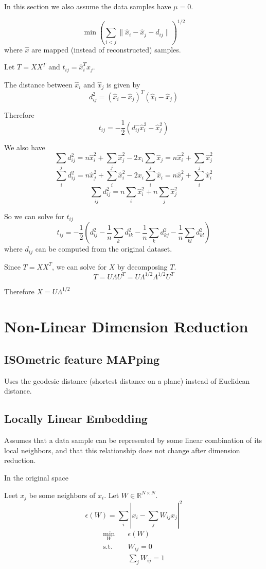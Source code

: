     In this section we also assume the data samples have $\mu=0$.

    \[ \min \left(\sum_{i<j}\|\hat{x}_i-\hat{x}_j-d_{ij}\|\right)^{1/2} \]
    where $\hat{x}$ are mapped (instead of reconstructed) samples.

    Let $T=XX^T$ and $t_{ij}=\hat{x}_i^T\hat{x}_j$.

    The distance between $\hat{x}_i$ and $\hat{x}_j$ is given by
    \[d_{ij}^2 = (\hat{x}_i-\hat{x}_j)^T(\hat{x}_i-\hat{x}_j)\]

    Therefore
    \[ t_{ij} = -\frac{1}{2}(d_{ij}^-\hat{x}_i^2-\hat{x}_j^2) \]

    We also have
    \[\sum_j d_{ij}^2 = n\hat{x}_i^2 + \sum_j\hat{x}_j^2 - 2x_i\sum_j\hat{x}_j = n\hat{x}_i^2 + \sum_j\hat{x}_j^2\]
    \[\sum_i d_{ij}^2 = n\hat{x}_j^2 + \sum_i\hat{x}_i^2 - 2x_i\sum_i\hat{x}_i = n\hat{x}_j^2 + \sum_i\hat{x}_i^2\]
    \[\sum_{ij}d_{ij}^2=n\sum_i\hat{x}_i^2 + n\sum_j\hat{x}_j^2 \]

    So we can solve for $t_{ij}$
    \[ t_{ij} = -\frac{1}{2}\left(d_{ij}^2-\frac{1}{n}\sum_kd_{ik}^2-\frac{1}{n}\sum_kd_{kj}^2-\frac{1}{n}\sum_{kl}d_{kl}^2\right) \]
    where $d_{ij}$ can be computed from the original dataset.

    Since $T=XX^T$, we can solve for $X$ by decomposing $T$.
    \[T = U\Lambda U^T = U\Lambda^{1/2}\Lambda^{1/2}U^T\]

    Therefore $X=U\Lambda^{1/2}$


\section{Non-Linear Dimension Reduction}
    \subsection{ISOmetric feature MAPping}
        Uses the geodesic distance (shortest distance on a plane) instead of Euclidean distance.

    \subsection{Locally Linear Embedding}
        Assumes that a data sample can be represented by some linear combination of its local neighbors, and that this relationship does not change after dimension reduction.

        In the original space

        Leet $x_j$ be some neighbors of $x_i$. Let $W \in \mathbb{R}^{N \times N}$.
        \[ \epsilon(W) = \sum_i \left|x_i - \sum_jW_{ij}x_j\right|^2 \]
        \begin{align*}
            \min_W &\quad \epsilon(W)\\
            \text{s.t.} &\quad W_{ij} = 0\\
            &\quad \sum_j W_{ij}=1
        \end{align*}

